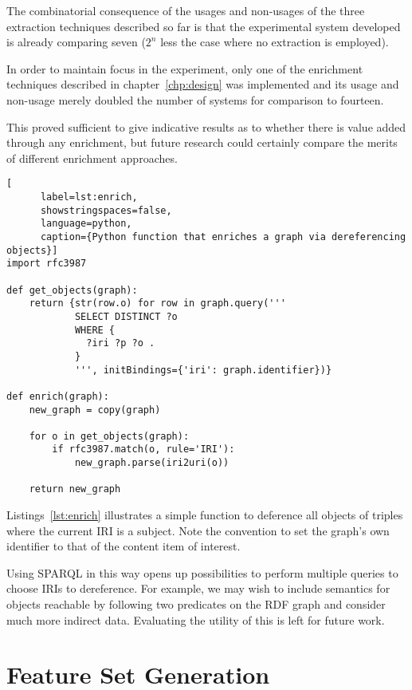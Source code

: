 The combinatorial consequence of the usages and non-usages of the
three extraction techniques described so far is that the
experimental system developed is already comparing seven ($2^n$ less
the case where no extraction is employed).

In order to maintain focus in the experiment, only one of the
enrichment techniques described in chapter~\ref{chp:design} was
implemented and its usage and non-usage merely doubled the
number of systems for comparison to fourteen.

This proved sufficient to give indicative results as to whether there
is value added through any enrichment, but future research could
certainly compare the merits of different enrichment approaches.

\begin{centering}
  \begin{lstlisting}[
      label=lst:enrich,
      showstringspaces=false,
      language=python,
      caption={Python function that enriches a graph via dereferencing objects}]
import rfc3987
    
def get_objects(graph):
    return {str(row.o) for row in graph.query('''
            SELECT DISTINCT ?o
            WHERE {
              ?iri ?p ?o .
            }
            ''', initBindings={'iri': graph.identifier})}

def enrich(graph):
    new_graph = copy(graph)

    for o in get_objects(graph):
        if rfc3987.match(o, rule='IRI'):
            new_graph.parse(iri2uri(o))

    return new_graph
  \end{lstlisting}
\end{centering}

Listings~\ref{lst:enrich} illustrates a simple function to
deference all objects of triples where the current IRI is a subject.
Note the convention to set the graph's own identifier to that of
the content item of interest.

Using SPARQL in this way opens up possibilities to perform multiple
queries to choose IRIs to dereference. For example, we may wish to
include semantics for objects reachable by following two predicates
on the RDF graph and consider much more indirect data. Evaluating
the utility of this is left for future work.

\section{Feature Set Generation}

